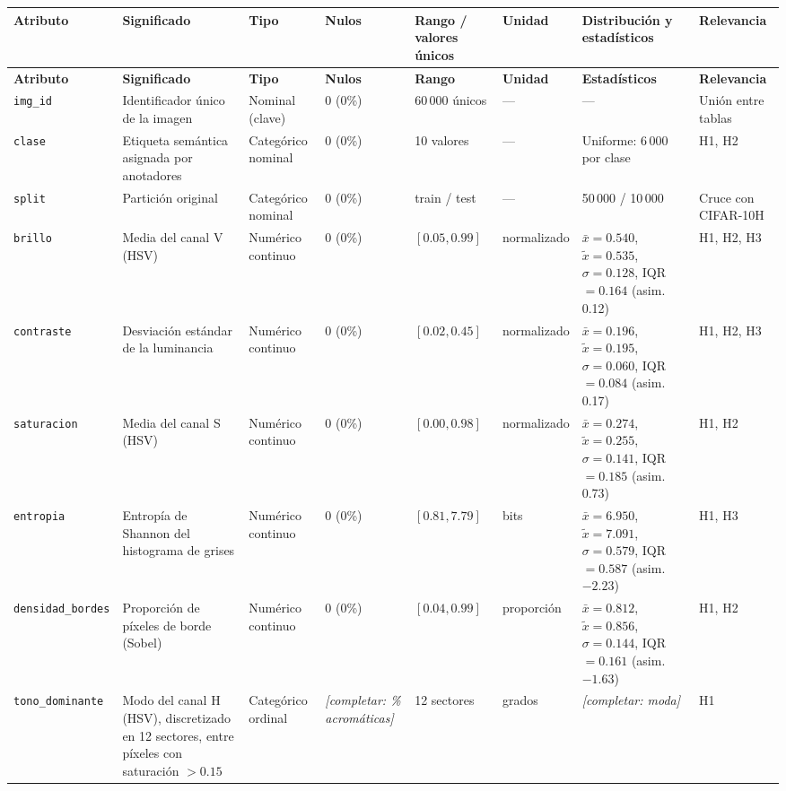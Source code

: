 \documentclass[11pt,a4paper]{article}
\begin{document}
{\scriptsize
\begin{longtable}{@{}p{1.9cm}p{2.6cm}p{1.7cm}p{1.2cm}p{1.9cm}p{1.1cm}p{2.1cm}p{1.9cm}@{}}
\toprule
\textbf{Atributo} & \textbf{Significado} & \textbf{Tipo} & \textbf{Nulos} & \textbf{Rango / valores únicos} & \textbf{Unidad} & \textbf{Distribución y estadísticos} & \textbf{Relevancia} \\
\midrule
\endfirsthead
\toprule
\textbf{Atributo} & \textbf{Significado} & \textbf{Tipo} & \textbf{Nulos} & \textbf{Rango} & \textbf{Unidad} & \textbf{Estadísticos} & \textbf{Relevancia} \\
\midrule
\endhead
\texttt{img\_id} & Identificador único de la imagen & Nominal (clave) & 0 (0\%) & 60\,000 únicos & --- & --- & Unión entre tablas \\
\texttt{clase} & Etiqueta semántica asignada por anotadores & Categórico nominal & 0 (0\%) & 10 valores & --- & Uniforme: 6\,000 por clase & H1, H2 \\
\texttt{split} & Partición original & Categórico nominal & 0 (0\%) & train / test & --- & 50\,000 / 10\,000 & Cruce con CIFAR-10H \\
\texttt{brillo} & Media del canal V (HSV) & Numérico continuo & 0 (0\%) & $[0.05, 0.99]$ & normalizado & $\bar{x}=0.540$, $\tilde{x}=0.535$, $\sigma=0.128$, IQR$=0.164$ (asim. 0.12) & H1, H2, H3 \\
\texttt{contraste} & Desviación estándar de la luminancia & Numérico continuo & 0 (0\%) & $[0.02, 0.45]$ & normalizado & $\bar{x}=0.196$, $\tilde{x}=0.195$, $\sigma=0.060$, IQR$=0.084$ (asim. 0.17) & H1, H2, H3 \\
\texttt{saturacion} & Media del canal S (HSV) & Numérico continuo & 0 (0\%) & $[0.00, 0.98]$ & normalizado & $\bar{x}=0.274$, $\tilde{x}=0.255$, $\sigma=0.141$, IQR$=0.185$ (asim. 0.73) & H1, H2 \\
\texttt{entropia} & Entropía de Shannon del histograma de grises & Numérico continuo & 0 (0\%) & $[0.81, 7.79]$ & bits & $\bar{x}=6.950$, $\tilde{x}=7.091$, $\sigma=0.579$, IQR$=0.587$ (asim. $-2.23$) & H1, H3 \\
\texttt{densidad\_bordes} & Proporción de píxeles de borde (Sobel) & Numérico continuo & 0 (0\%) & $[0.04, 0.99]$ & proporción & $\bar{x}=0.812$, $\tilde{x}=0.856$, $\sigma=0.144$, IQR$=0.161$ (asim. $-1.63$) & H1, H2 \\
\texttt{tono\_dominante} & Modo del canal H (HSV), discretizado en 12 sectores, entre píxeles con saturación $>0.15$ & Categórico ordinal & \emph{[completar: \% acromáticas]} & 12 sectores & grados & \emph{[completar: moda]} & H1 \\

\end{longtable}}
\end{document}
